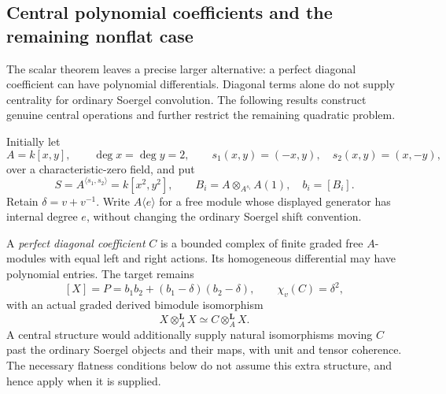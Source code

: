 \subsection{Central polynomial coefficients and the remaining nonflat case}

The scalar theorem leaves a precise larger alternative:
a perfect diagonal coefficient can have polynomial
differentials. Diagonal terms alone do not supply
centrality for ordinary Soergel convolution. The
following results construct genuine central operations
and further restrict the remaining quadratic problem.

Initially let
\[
 A=k[x,y],\qquad \deg x=\deg y=2,\qquad
 s_1(x,y)=(-x,y),\quad s_2(x,y)=(x,-y),
\]
over a characteristic-zero field, and put
\[
 S=A^{\langle s_1,s_2\rangle}=k[x^2,y^2],\qquad
 B_i=A\otimes_{A^{s_i}}A(1),\quad b_i=[B_i].
\]
Retain \(\delta=v+v^{-1}\).
Write \(A\langle e\rangle\) for a free module whose
displayed generator has internal degree \(e\), without
changing the ordinary Soergel shift convention.

A \emph{perfect diagonal coefficient} \(C\) is a
bounded complex of finite graded free \(A\)-modules
with equal left and right actions. Its homogeneous
differential may have polynomial entries.
The target remains
\begin{equation}\label{eq:centralCoefficientTarget}
 [X]=P=b_1b_2+(b_1-\delta)(b_2-\delta),\qquad
 \chi_v(C)=\delta^2,
\end{equation}
with an actual graded derived bimodule isomorphism
\begin{equation}\label{eq:centralCoefficientQuadratic}
 X\otimes_A^{\mathbf L}X
       \simeq C\otimes_A^{\mathbf L}X.
\end{equation}
A central structure would additionally supply natural
isomorphisms moving \(C\) past the ordinary Soergel
objects and their maps, with unit and tensor coherence.
The necessary flatness conditions below do not assume
this extra structure, and hence apply when it is supplied.

